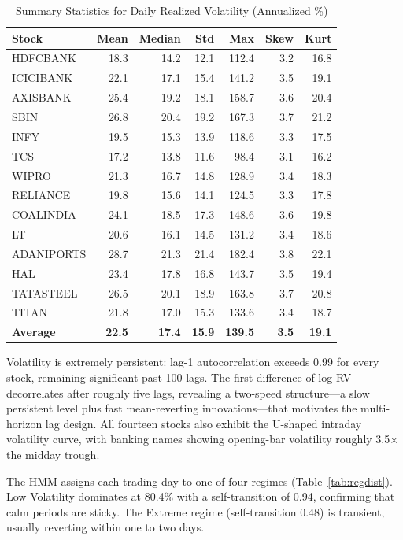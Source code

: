 \begin{table}[h!]
\caption{Summary Statistics for Daily Realized Volatility (Annualized \%)}
\label{tab:datastats}
\centering
\scriptsize
\begin{tabular}{lrrrrrr}
\hline
\textbf{Stock} & \textbf{Mean} & \textbf{Median} & \textbf{Std} & \textbf{Max} & \textbf{Skew} & \textbf{Kurt} \\
\hline
HDFCBANK & 18.3 & 14.2 & 12.1 & 112.4 & 3.2 & 16.8 \\
ICICIBANK & 22.1 & 17.1 & 15.4 & 141.2 & 3.5 & 19.1 \\
AXISBANK & 25.4 & 19.2 & 18.1 & 158.7 & 3.6 & 20.4 \\
SBIN & 26.8 & 20.4 & 19.2 & 167.3 & 3.7 & 21.2 \\
INFY & 19.5 & 15.3 & 13.9 & 118.6 & 3.3 & 17.5 \\
TCS & 17.2 & 13.8 & 11.6 & 98.4 & 3.1 & 16.2 \\
WIPRO & 21.3 & 16.7 & 14.8 & 128.9 & 3.4 & 18.3 \\
RELIANCE & 19.8 & 15.6 & 14.1 & 124.5 & 3.3 & 17.8 \\
COALINDIA & 24.1 & 18.5 & 17.3 & 148.6 & 3.6 & 19.8 \\
LT & 20.6 & 16.1 & 14.5 & 131.2 & 3.4 & 18.6 \\
ADANIPORTS & 28.7 & 21.3 & 21.4 & 182.4 & 3.8 & 22.1 \\
HAL & 23.4 & 17.8 & 16.8 & 143.7 & 3.5 & 19.4 \\
TATASTEEL & 26.5 & 20.1 & 18.9 & 163.8 & 3.7 & 20.8 \\
TITAN & 21.8 & 17.0 & 15.3 & 133.6 & 3.4 & 18.7 \\
\hline
\textbf{Average} & \textbf{22.5} & \textbf{17.4} & \textbf{15.9} & \textbf{139.5} & \textbf{3.5} & \textbf{19.1} \\
\hline
\end{tabular}
\end{table}

Volatility is extremely persistent: lag-1 autocorrelation exceeds 0.99 for every stock, remaining significant past 100 lags. The first difference of log RV decorrelates after roughly five lags, revealing a two-speed structure---a slow persistent level plus fast mean-reverting innovations---that motivates the multi-horizon lag design. All fourteen stocks also exhibit the U-shaped intraday volatility curve, with banking names showing opening-bar volatility roughly 3.5$\times$ the midday trough.

The HMM assigns each trading day to one of four regimes (Table~\ref{tab:regdist}). Low Volatility dominates at 80.4\% with a self-transition of 0.94, confirming that calm periods are sticky. The Extreme regime (self-transition 0.48) is transient, usually reverting within one to two days.

